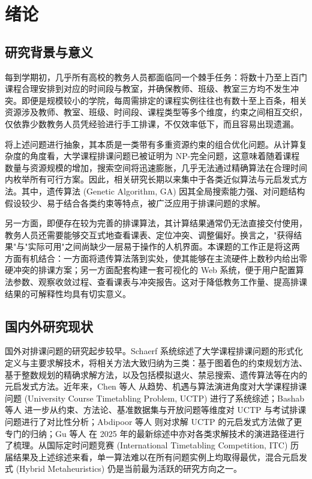 \hspace*{\fill}
\section{绪论}

\subsection{研究背景与意义}

每到学期初，几乎所有高校的教务人员都面临同一个棘手任务：将数十乃至上百门课程合理安排到对应的时间段与教室，并确保教师、班级、教室三方均不发生冲突。即便是规模较小的学院，每周需排定的课程实例往往也有数十至上百条，相关资源涉及教师、教室、班级、时间段、课程类型等多个维度，约束之间相互交织，仅依靠少数教务人员凭经验进行手工排课，不仅效率低下，而且容易出现遗漏。

将上述问题进行抽象，其本质是一类带有多重资源约束的组合优化问题。从计算复杂度的角度看，大学课程排课问题已被证明为 NP-完全问题，这意味着随着课程数量与资源规模的增加，搜索空间将迅速膨胀，几乎无法通过精确算法在合理时间内枚举所有可行方案。因此，相关研究长期以来集中于各类近似算法与元启发式方法。其中，遗传算法 (Genetic Algorithm, GA) 因其全局搜索能力强、对问题结构假设较少、易于结合各类约束等特点，被广泛应用于排课问题的求解。

另一方面，即便存在较为完善的排课算法，其计算结果通常仍无法直接交付使用，教务人员还需要能够交互式地查看课表、定位冲突、调整偏好。换言之，"获得结果"与"实际可用"之间尚缺少一层易于操作的人机界面。本课题的工作正是将这两方面有机结合：一方面将遗传算法落到实处，使其能够在主流硬件上数秒内给出零硬冲突的排课方案；另一方面配套构建一套可视化的 Web 系统，便于用户配置算法参数、观察收敛过程、查看课表与冲突报告。这对于降低教务工作量、提高排课结果的可解释性均具有切实意义。

\subsection{国内外研究现状}

国外对排课问题的研究起步较早。Schaerf 系统综述了大学课程排课问题的形式化定义与主要求解技术，将相关方法大致归纳为三类：基于图着色的约束规划方法、基于整数规划的精确求解方法，以及包括模拟退火、禁忌搜索、遗传算法等在内的元启发式方法。近年来，Chen 等人 从趋势、机遇与算法演进角度对大学课程排课问题 (University Course Timetabling Problem, UCTP) 进行了系统综述；Bashab 等人 进一步从约束、方法论、基准数据集与开放问题等维度对 UCTP 与考试排课问题进行了对比性分析；Abdipoor 等人 则对求解 UCTP 的元启发式方法做了更专门的归纳；Gu 等人 在 2025 年的最新综述中亦对各类求解技术的演进路径进行了梳理。从国际定时问题竞赛 (International Timetabling Competition, ITC) 历届结果及上述综述来看，单一算法难以在所有问题实例上均取得最优，混合元启发式 (Hybrid Metaheuristics) 仍是当前最为活跃的研究方向之一。

